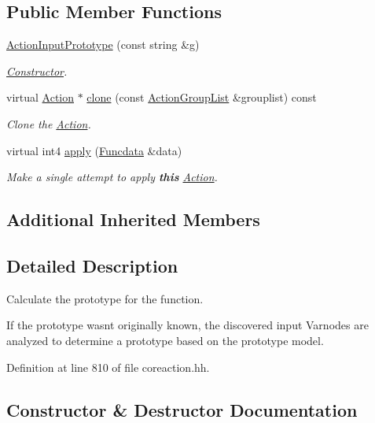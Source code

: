 \subsection*{Public Member Functions}
\begin{DoxyCompactItemize}
\item 
\mbox{\hyperlink{class_action_input_prototype_a9b8cea2e70db69b470fc06b8581626df}{Action\+Input\+Prototype}} (const string \&g)
\begin{DoxyCompactList}\small\item\em \mbox{\hyperlink{class_constructor}{Constructor}}. \end{DoxyCompactList}\item 
virtual \mbox{\hyperlink{class_action}{Action}} $\ast$ \mbox{\hyperlink{class_action_input_prototype_a2443b3263f3b443bb7c99261a7f6289e}{clone}} (const \mbox{\hyperlink{class_action_group_list}{Action\+Group\+List}} \&grouplist) const
\begin{DoxyCompactList}\small\item\em Clone the \mbox{\hyperlink{class_action}{Action}}. \end{DoxyCompactList}\item 
virtual int4 \mbox{\hyperlink{class_action_input_prototype_ace1078c436c86aba604abb99b82180ae}{apply}} (\mbox{\hyperlink{class_funcdata}{Funcdata}} \&data)
\begin{DoxyCompactList}\small\item\em Make a single attempt to apply {\bfseries{this}} \mbox{\hyperlink{class_action}{Action}}. \end{DoxyCompactList}\end{DoxyCompactItemize}
\subsection*{Additional Inherited Members}


\subsection{Detailed Description}
Calculate the prototype for the function. 

If the prototype wasn\textquotesingle{}t originally known, the discovered input Varnodes are analyzed to determine a prototype based on the prototype model. 

Definition at line 810 of file coreaction.\+hh.



\subsection{Constructor \& Destructor Documentation}
\mbox{\label{class_action_input_prototype_a9b8cea2e70db69b470fc06b8581626df}} 
